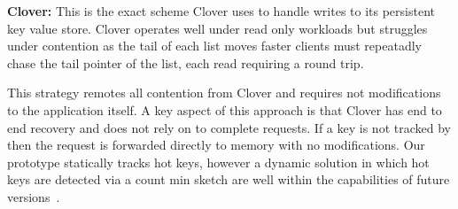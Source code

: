 \textbf{Clover:} This is the exact scheme Clover uses to
handle writes to its persistent key value store. Clover
operates well under read only workloads but struggles under
contention as the tail of each list moves faster clients
must repeatadly chase the tail pointer of the list, each
read requiring a round trip.

This strategy remotes all contention from Clover and
requires not modifications to the application itself. A key
aspect of this approach is that Clover has end to end
recovery and does not rely on {\sword} to complete requests.
If a key is not tracked by {\sword} then the request is
forwarded directly to memory with no modifications. Our
prototype statically tracks hot keys, however a dynamic
solution in which hot keys are detected via a count min
sketch are well within the capabilities of future
versions~\cite{switchml}.